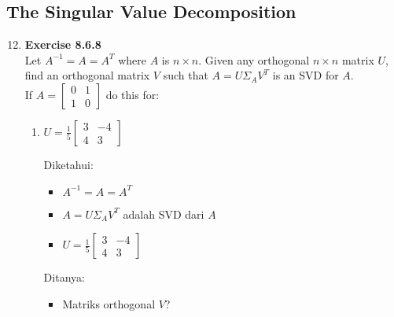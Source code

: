 \documentclass[12pt, a4paper]{scrartcl}
\begin{document}
    \subsection*{The Singular Value Decomposition}
        \begin{enumerate}
            \setcounter{enumi}{11}
            \item \textbf{Exercise 8.6.8}\\Let $A^{-1}=A=A^T$ where $A$ is $n \times n$. Given any orthogonal $n \times n$ matrix $U$, find an orthogonal matrix $V$ such that $A=U\Sigma _AV^T$ is an SVD for $A$.\\If $A=\begin{bmatrix}
                0&1\\1&0
            \end{bmatrix}$ do this for:
            \begin{enumerate}
                \item $U=\frac{1}{5}\begin{bmatrix}
                    3&-4\\4&3
                \end{bmatrix}$

                \pagebreak

                Diketahui:
                \begin{itemize}
                    \item[] $A^{-1}=A=A^T$
                    \item[] $A=U\Sigma _AV^T$ adalah SVD dari $A$
                    \item[] $U=\frac{1}{5}\begin{bmatrix}
                        3&-4\\4&3
                    \end{bmatrix}$
                \end{itemize}

                Ditanya:
                \begin{itemize}
                    \item Matriks orthogonal $V$?
                \end{itemize}


\end{enumerate}
\end{enumerate}
\end{document}
